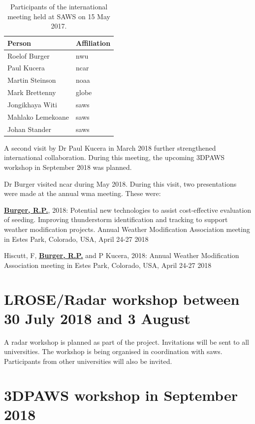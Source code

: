 \documentclass{wrcreport}
\begin{document}
\begin{table}[!htbp]
  \begin{center}
\caption{Participants of the international meeting held at SAWS on 15 May 2017.}
\label{table:team}
\begin{tabular}{ l l }
\toprule
\bfseries Person & \bfseries Affiliation \\
\midrule
Roelof Burger & \gls{nwu} \\
Paul Kucera & \gls{ncar} \\
Martin Steinson & \gls{noaa} \\
Mark Brettenny & \gls{globe} \\
Jongikhaya Witi & \gls{saws} \\
Mahlako Lemekoane & \gls{saws} \\
Johan Stander & \gls{saws} \\
\bottomrule
\end{tabular}
  \end{center}
\end{table}

A second visit by Dr Paul Kucera in March 2018 further strengthened international collaboration. During this meeting, the upcoming 3DPAWS workshop in September 2018 was planned.

Dr Burger visited \gls{ncar} during May 2018. During this visit, two presentations were made at the annual \gls{wma} meeting. These were:

\underline{\textbf{Burger, R.P.}}, 2018: Potential new technologies to assist cost-effective evaluation of seeding. Improving thunderstorm identification and tracking to support weather modification projects. Annual Weather Modification Association meeting in Estes Park, Colorado, USA, April 24-27 2018

Hiscutt, F, \underline{\textbf{Burger, R.P.}} and P Kucera, 2018: Annual Weather Modification Association meeting in Estes Park, Colorado, USA, April 24-27 2018

\section{LROSE/Radar workshop between 30 July 2018 and 3 August}

A radar workshop is planned as part of the project. Invitations will be sent to all universities. The workshop is being organised in coordination with \gls{saws}. Participants from other universities will also be invited.

\section{3DPAWS workshop in September 2018}
\end{document}

